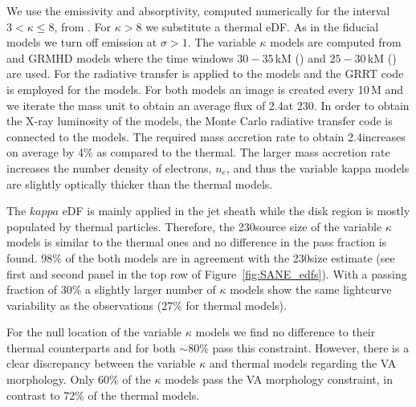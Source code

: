 We use the emissivity and absorptivity, computed numerically for the interval $3 < \kappa \le 8$, from  \cite{2016ApJ...822...34P}.
For $\kappa > 8$ we substitute a thermal eDF.
As in the fiducial models we turn off emission at $\sigma > 1$.
The variable $\kappa$ models are computed from \hamr and \bhac GRMHD models where the time windows $30-35$\,kM (\hamr) and $25-30$\,kM (\bhac) are used.
For the radiative transfer \ipole is applied to the \hamr models and the GRRT code \bhoss is employed for the \bhac models.
For both models an image is created every 10\,M and we iterate the mass unit to obtain an average flux of 2.4\Jy at 230\GHz.
In order to obtain the X-ray luminosity of the models, the Monte Carlo radiative transfer code \grmonty is connected to the \hamr models.
The required mass accretion rate to obtain 2.4\Jy increases on average by 4\% as compared to the thermal.
The larger mass accretion rate increases the number density of electrons, $n_e$, and thus the variable kappa models are slightly optically thicker than the thermal models.


The $kappa$ eDF is mainly applied in the jet sheath while the disk region is mostly populated by thermal particles.
Therefore, the 230\GHz source size of the variable $\kappa$ models is similar to the thermal ones and no difference in the pass fraction is found.
98\% of the both models are in agreement with the 230\GHz size estimate (see first and second panel in the top row of Figure~\ref{fig:SANE_edfs}).
With a passing fraction of 30\% a slightly larger number of $\kappa$ models show the same lightcurve variability as the observations (27\% for thermal models).


For the null location of the variable $\kappa$ models we find no difference to their thermal counterparts and for both $\sim$80\% pass this constraint.
However, there is a clear discrepancy between the variable $\kappa$ and thermal models regarding the VA morphology.
Only 60\% of the $\kappa$ models pass the VA morphology constraint, in contrast to 72\% of the thermal models.


